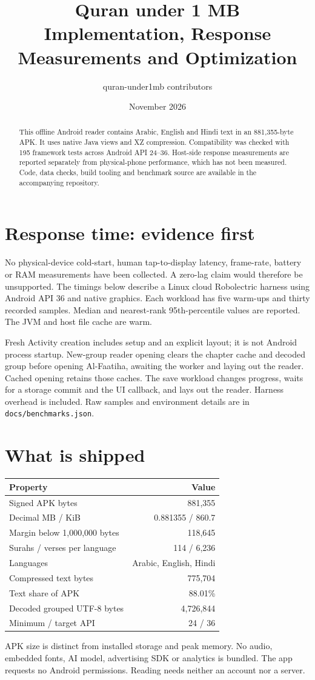 \documentclass[11pt,a4paper]{article}
\title{Quran under 1 MB\\Implementation, Response Measurements and Optimization}
\author{quran-under1mb contributors}
\date{November 2026}
\begin{document}
\maketitle
\begin{abstract}
This offline Android reader contains Arabic, English and Hindi text in an
881,355-byte APK. It uses native Java views and XZ compression. Compatibility
was checked with 195 framework tests across Android API 24--36. Host-side
response measurements are reported separately from physical-phone performance,
which has not been measured. Code, data checks, build tooling and benchmark
source are available in the accompanying repository.
\end{abstract}
\section{Response time: evidence first}
No physical-device cold-start, human tap-to-display latency, frame-rate,
battery or RAM measurements have been collected. A zero-lag claim would
therefore be unsupported. The timings below describe a Linux cloud
Robolectric harness using Android API 36 and native graphics. Each workload
has five warm-ups and thirty recorded samples. Median and nearest-rank
95th-percentile values are reported. The JVM and host file cache are warm.

Fresh Activity creation includes setup and an explicit layout; it is not
Android process startup. New-group reader opening clears the chapter cache
and decoded group before opening Al-Faatiha, awaiting the worker and laying
out the reader. Cached opening retains those caches. The save workload
changes progress, waits for a storage commit and the UI callback, and lays
out the reader. Harness overhead is included. Raw samples and environment
details are in \texttt{docs/benchmarks.json}.

\section{What is shipped}
\begin{center}\begin{tabular}{lr}\toprule
Property & Value\\\midrule
Signed APK bytes & 881,355\\
Decimal MB / KiB & 0.881355 / 860.7\\
Margin below 1,000,000 bytes & 118,645\\
Surahs / verses per language & 114 / 6,236\\
Languages & Arabic, English, Hindi\\
Compressed text bytes & 775,704\\
Text share of APK & 88.01\%\\
Decoded grouped UTF-8 bytes & 4,726,844\\
Minimum / target API & 24 / 36\\\bottomrule
\end{tabular}\end{center}
APK size is distinct from installed storage and peak memory. No audio,
embedded fonts, AI model, advertising SDK or analytics is bundled. The app
requests no Android permissions. Reading needs neither an account nor a server.
\end{document}

